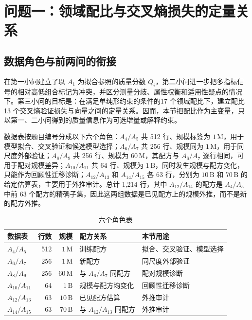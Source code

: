 \section{问题一：领域配比与交叉熵损失的定量关系}
\label{sec:q13}

\subsection{数据角色与前两问的衔接}

在第一小问建立了以 $A_1$ 为拟合参照的质量分数 $Q_i$，第二小问进一步把多指标信号的相对高低组合标记为冲突，并区分测量分歧、属性权衡和适用性疑点的情况下。第三小问的目标是：在满足单纯形约束的条件的17 个领域配比下，建立配比 13 个交叉熵验证损失与向量之间的定量关系。因而，本节把配比作为主变量，只以第一、二小问得到的质量信息作为可选增量或解释约束。

数据表按题目编号分成以下六个角色：$A_4/A_5$ 共 512 行、规模标签为 $1\,\mathrm{M}$，用于模型拟合、交叉验证和候选模型选择；$A_6/A_7$ 共 256 行、规模同为 $1\,\mathrm{M}$，用于同尺度外部验证；$A_8/A_9$ 共 256 行、规模为 $60\,\mathrm{M}$，其配方与 $A_6/A_7$ 逐行相同，可用于配对规模差异；$A_{10}/A_{11}$ 共 64 行、规模为 $1\,\mathrm{B}$，同时发生规模与配方变化，只能作为回顾性迁移诊断；$A_{12}/A_{13}$ 和 $A_{14}/A_{15}$ 各 63 行，分别为 $10\,\mathrm{B}$ 和 $70\,\mathrm{B}$ 的给定估算表，主要用于外推审计。总计 1,214 行，其中 $A_{12}/A_{14}$ 的配方是 $A_4/A_5$ 中前 63 个配方的精确子集，因此这两组数据是已见配方上的规模外推，而不是新的配方外推。

\begin{table}[htbp]
  \centering
  \caption{六个角色表}
  \label{tab:q13-data-role}
  \renewcommand{\arraystretch}{1.12}
  \begin{tabular}{lrrll}
    \toprule
    数据表 & 行数 & 规模 & 配方关系 & 本节用途 \\
    \midrule
    $A_4/A_5$ & 512 & $1\,\mathrm{M}$ & 训练配方 & 拟合、交叉验证、模型选择 \\
    $A_6/A_7$ & 256 & $1\,\mathrm{M}$ & 新配方 & 同尺度外部验证 \\
    $A_8/A_9$ & 256 & $60\,\mathrm{M}$ & 与 $A_6/A_7$ 同配方 & 配对规模诊断 \\
    $A_{10}/A_{11}$ & 64 & $1\,\mathrm{B}$ & 规模与配方均变化 & 回顾性迁移诊断 \\
    $A_{12}/A_{13}$ & 63 & $10\,\mathrm{B}$ & 已见配方估算 & 外推审计 \\
    $A_{14}/A_{15}$ & 63 & $70\,\mathrm{B}$ & 与 $A_{12}/A_{13}$ 同配方 & 外推审计 \\
    \bottomrule
  \end{tabular}
\end{table}

